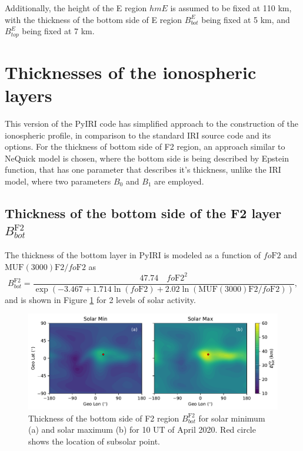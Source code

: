 \documentclass[draft]{agujournal2019}
\begin{document}
Additionally, the height of the E region $hmE$ is assumed to be fixed at 110 km, with the thickness of the bottom side of E region $B^{E}_{bot}$ being fixed at 5 km, and $B^{E}_{top}$ being fixed at 7 km. 


\section{Thicknesses of the ionospheric layers}\label{sec:thicknesses}
This version of the PyIRI code has simplified approach to the construction of the ionospheric profile, in comparison to the standard IRI source code and its options. For the thickness of bottom side of F2 region, an approach similar to NeQuick model is chosen, where the bottom side is being described by Epstein function, that has one parameter that describes it's thickness, unlike the IRI model, where two parameters $B_0$ and $B_1$ are employed. 

\subsection{Thickness of the bottom side of the F2 layer $B^{\mathrm{F2}}_{bot}$}\label{sec:B_F2_bot}
The thickness of the bottom layer in PyIRI is modeled as a function of $fo\mathrm{F2}$ and $\mathrm{MUF(3000)F2}/fo\mathrm{F2}$ as
\begin{equation}\label{eqn:B_F2_bot}
B^{\mathrm{F2}}_{bot}=\frac{47.74 \quad fo\mathrm{F2}^2 }{\exp(-3.467+1.714\ln(fo\mathrm{F2})+2.02\ln(\mathrm{MUF(3000)F2}/fo\mathrm{F2}))},
\end{equation}
and is shown in Figure \ref{fig:BF2_bot_min_max} for 2 levels of solar activity.

\begin{figure}[H]
  \includegraphics[scale=0.7]{PyIRI_B_F2_bot_min_max.pdf}
  \caption{Thickness of the bottom side of F2 region $B^{\mathrm{F2}}_{bot}$ for solar minimum (a) and solar maximum (b) for 10 UT of April 2020. Red circle shows the location of subsolar point.}
  \label{fig:BF2_bot_min_max}
\end{figure}
\end{document}
